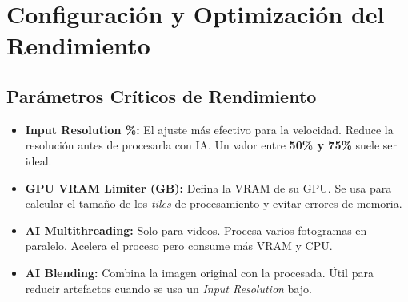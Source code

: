 \documentclass[11pt, a4paper]{article}
\begin{document}
\section{Configuración y Optimización del Rendimiento}

\subsection{Parámetros Críticos de Rendimiento}
\begin{itemize}[leftmargin=*]
    \item \textbf{Input Resolution \%:} El ajuste más efectivo para la velocidad. Reduce la resolución antes de procesarla con IA. Un valor entre \textbf{50\% y 75\%} suele ser ideal.
    \item \textbf{GPU VRAM Limiter (GB):} Defina la VRAM de su GPU. Se usa para calcular el tamaño de los \textit{tiles} de procesamiento y evitar errores de memoria.
    \item \textbf{AI Multithreading:} Solo para videos. Procesa varios fotogramas en paralelo. Acelera el proceso pero consume más VRAM y CPU.
    \item \textbf{AI Blending:} Combina la imagen original con la procesada. Útil para reducir artefactos cuando se usa un \textit{Input Resolution} bajo.
\end{itemize}
\end{document}
